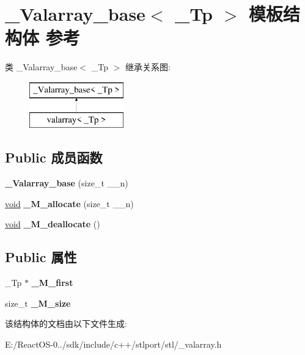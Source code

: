 \hypertarget{struct___valarray__base}{}\section{\+\_\+\+Valarray\+\_\+base$<$ \+\_\+\+Tp $>$ 模板结构体 参考}
\label{struct___valarray__base}
类 \+\_\+\+Valarray\+\_\+base$<$ \+\_\+\+Tp $>$ 继承关系图\+:\begin{figure}[H]
\begin{center}
\leavevmode
\includegraphics[height=2.000000cm]{struct___valarray__base}
\end{center}
\end{figure}
\subsection*{Public 成员函数}
\begin{DoxyCompactItemize}
\item 
\mbox{\label{struct___valarray__base_aef3238930bb4c68ea219b55c5acc764e}} 
{\bfseries \+\_\+\+Valarray\+\_\+base} (size\+\_\+t \+\_\+\+\_\+n)
\item 
\mbox{\label{struct___valarray__base_af184cc3650ecf1a4129a51f30be38454}} 
\hyperlink{interfacevoid}{void} {\bfseries \+\_\+\+M\+\_\+allocate} (size\+\_\+t \+\_\+\+\_\+n)
\item 
\mbox{\label{struct___valarray__base_a416074784e36a3246a309567333f31d8}} 
\hyperlink{interfacevoid}{void} {\bfseries \+\_\+\+M\+\_\+deallocate} ()
\end{DoxyCompactItemize}
\subsection*{Public 属性}
\begin{DoxyCompactItemize}
\item 
\mbox{\label{struct___valarray__base_a59a4f1da73f046b8dc6b7bf0afa551d3}} 
\+\_\+\+Tp $\ast$ {\bfseries \+\_\+\+M\+\_\+first}
\item 
\mbox{\label{struct___valarray__base_ab80429eb765afc7b2f5c37dd191d8f65}} 
size\+\_\+t {\bfseries \+\_\+\+M\+\_\+size}
\end{DoxyCompactItemize}


该结构体的文档由以下文件生成\+:\begin{DoxyCompactItemize}
\item 
E\+:/\+React\+O\+S-\/0../sdk/include/c++/stlport/stl/\+\_\+valarray.\+h\end{DoxyCompactItemize}
